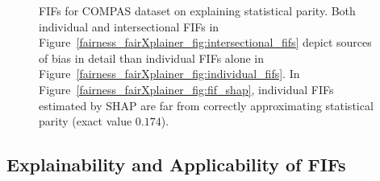 \begin{figure}
	
	\caption{FIFs for COMPAS dataset on explaining statistical parity. Both individual and intersectional FIFs in Figure~\ref{fairness_fairXplainer_fig:intersectional_fifs} depict sources of bias in detail than individual FIFs alone in Figure~\ref{fairness_fairXplainer_fig:individual_fifs}. In Figure~\ref{fairness_fairXplainer_fig:fif_shap}, individual FIFs estimated by SHAP are far from correctly approximating statistical parity (exact value $0.174 $).}
	\label{fairness_fairXplainer_fig:fif_illustration_compas}
\end{figure}



\subsection{Explainability and Applicability of FIFs}
